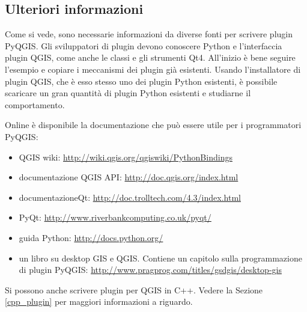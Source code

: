 \subsection{Ulteriori informazioni}

Come si vede, sono necessarie informazioni da diverse fonti per scrivere plugin PyQGIS. Gli sviluppatori di plugin devono conoscere Python e l'interfaccia plugin QGIS, come anche le classi e gli strumenti Qt4. All'inizio è bene seguire l'esempio e copiare i meccanismi dei plugin già esistenti. Usando l'installatore di plugin QGIS, che è esso stesso uno dei plugin Python esistenti, è possibile scaricare un gran quantità di plugin Python esistenti e studiarne il comportamento.

Online è disponibile la documentazione che può essere utile per i programmatori PyQGIS:
 
\begin{itemize}
\item QGIS wiki: \url{http://wiki.qgis.org/qgiswiki/PythonBindings}
\item documentazione QGIS API: \url{http://doc.qgis.org/index.html}
\item documentazioneQt: \url{http://doc.trolltech.com/4.3/index.html}
\item PyQt: \url{http://www.riverbankcomputing.co.uk/pyqt/}
\item guida Python: \url{http://docs.python.org/}
\item un libro su desktop GIS e QGIS. Contiene un capitolo sulla programmazione di plugin PyQGIS: \url{http://www.pragprog.com/titles/gsdgis/desktop-gis} 
\end{itemize}

Si possono anche scrivere plugin per QGIS in C++. Vedere la Sezione \ref{cpp_plugin} per maggiori informazioni a riguardo.

